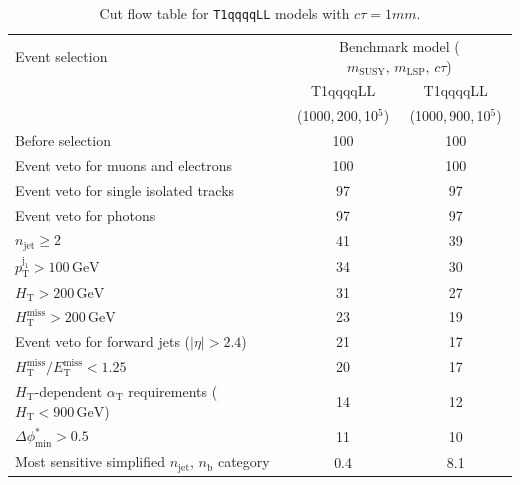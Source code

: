 \begin{table}[!h]
  \caption{Cut flow table for \texttt{T1qqqqLL} models with $c\tau = 1\unit{mm}$.} 
  \label{tab:cut_flow_ctau_100000}
{\scriptsize%
\centering
\begin{tabular}{lcc}
  \hline
  Event selection & \multicolumn{2}{c}{Benchmark model ($m_\mathrm{SUSY},\,m_\mathrm{LSP},\,c\tau$)} \\
  \cline{2-3}
   & T1qqqqLL & T1qqqqLL \\
    & (1000,\,200,\,10$^5$) & (1000,\,900,\,10$^5$) \\
  \hline
  Before selection  & 100\phantom{.1} & 100\phantom{.1} \\
  Event veto for muons and electrons & 100\phantom{.1} & 100\phantom{.1} \\
  Event veto for single isolated tracks & \phantom{1}97\phantom{.1} & \phantom{1}97\phantom{.1} \\
  Event veto for photons & \phantom{1}97\phantom{.1} & \phantom{1}97\phantom{.1} \\
   $n_{\mathrm{jet}} \geq 2$  & \phantom{1}41\phantom{.1} & \phantom{1}39\phantom{.1} \\
   $p_{\mathrm{T}}^{\mathrm{j_1}} > 100\,\mathrm{GeV}$ & \phantom{1}34\phantom{.1} & \phantom{1}30\phantom{.1} \\
   $H_{\mathrm{T}} > 200\,\mathrm{GeV}$  & \phantom{1}31\phantom{.1} & \phantom{1}27\phantom{.1} \\
  $H_{\mathrm{T}}^{\mathrm{miss}} > 200\,\mathrm{GeV}$  & \phantom{1}23\phantom{.1} & \phantom{1}19\phantom{.1} \\
  Event veto for forward jets ($|\eta| > 2.4$) & \phantom{1}21\phantom{.1} & \phantom{1}17\phantom{.1} \\
  $H_{\mathrm{T}}^{\mathrm{miss}} / E_{\mathrm{T}}^{\mathrm{miss}} < 1.25$ & \phantom{1}20\phantom{.1} & \phantom{1}17\phantom{.1} \\
  $H_{\mathrm{T}}$-dependent $\alpha_{\mathrm{T}}$ requirements ($H_{\mathrm{T}} < 900\,\mathrm{GeV}$)  &  \phantom{1}14 \phantom{.1} & \phantom{1}12\phantom{.1} \\
  $\Delta\phi^{*}_{\mathrm{min}} > 0.5$  &  \phantom{1}11\phantom{.1} & \phantom{1}10\phantom{.1} \\
  \hline
  Most sensitive simplified $n_{\mathrm{jet}}$, $n_{\mathrm{b}}$ category & \phantom{10}0.4 & \phantom{10}8.1 \\
  \hline
\end{tabular}
}
\end{table}

